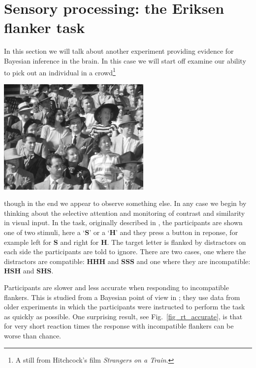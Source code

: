 \documentclass[12pt]{article}
\begin{document}
\section*{Sensory processing: the Eriksen flanker task}

In this section we will talk about another experiment providing
evidence for Bayesian inference in the brain. In this case we will
start off examine our ability to pick out an individual in a crowd\footnote{A still from Hitchcock's film \textsl{Strangers on a Train}.}
\begin{center}
\includegraphics[width=7.5cm]{Strangers_on_a_Train.png}
\end{center}
though in the end we appear to observe something else. In any case we
begin by thinking about the selective attention and monitoring of
contrast and similarity in visual input. In the task, originally described in \citet{EriksenEriksen1974}, the participants
are shown one of two stimuli, here a \lq{}\textbf{S}\rq{} or a
\lq{}\textbf{H}\rq{} and they press a button in reponse, for example
left for \textbf{S} and right for \textbf{H}. The target letter is
flanked by distractors on each side the participants are told to
ignore. There are two cases, one where the distractors are compatible:
\textbf{HHH} and \textbf{SSS} and one where they are incompatible:
\textbf{HSH} and \textbf{SHS}.

Participants are slower and less accurate when responding to
incompatible flankers. This is studied from a Bayesian point of view
in \cite{YuDayanCohen2009}; they use data from older experiments in
which the participants were instructed to perform the task as quickly
as possible. One surprising result, see Fig.~\ref{fig_rt_accurate}, is
that for very short reaction times the response with incompatible
flankers can be worse than chance.
\end{document}
